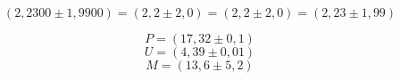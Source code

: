 \documentclass{article}
\begin{document}


$$
(2,2300 \pm 1,9900) =
(2,2 \pm 2,0) =
(2,2 \pm 2,0) =
(2,23 \pm 1,99) $$


$$ P=(17,32 \pm 0,1) $$
$$ U=(4,39 \pm 0,01) $$
$$ M = (13,6 \pm 5,2) $$
\end{document}
